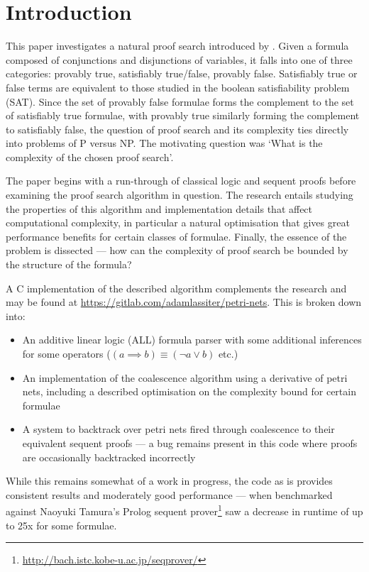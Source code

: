 \chapter{Introduction}
    
    This paper investigates a natural proof search introduced by \citet{petri-nets}.
    Given a formula composed of conjunctions and disjunctions of variables, it falls into one of three categories: provably true, satisfiably true/false, provably false.
    Satisfiably true or false terms are equivalent to those studied in the boolean satisfiability problem (SAT).
    Since the set of provably false formulae forms the complement to the set of satisfiably true formulae, with provably true similarly forming the complement to satisfiably false, the question of proof search and its complexity ties directly into problems of P versus NP\@.
    The motivating question was `What is the complexity of the chosen proof search'.
    
    The paper begins with a run-through of classical logic and sequent proofs before examining the proof search algorithm in question.
    The research entails studying the properties of this algorithm and implementation details that affect computational complexity, in particular a natural optimisation that gives great performance benefits for certain classes of formulae.
    Finally, the essence of the problem is dissected --- how can the complexity of proof search be bounded by the structure of the formula?
    
    A C implementation of the described algorithm complements the research and may be found at \url{https://gitlab.com/adamlassiter/petri-nets}.
    This is broken down into:
    \begin{itemize}
        \item An additive linear logic (ALL) formula parser with some additional inferences for some operators ($(a \implies b) \equiv (\neg a \vee b)$ etc.)
        \item An implementation of the coalescence algorithm using a derivative of petri nets, including a described optimisation on the complexity bound for certain formulae
        \item A system to backtrack over petri nets fired through coalescence to their equivalent sequent proofs --- a bug remains present in this code where proofs are occasionally backtracked incorrectly
    \end{itemize}
    While this remains somewhat of a work in progress, the code as is provides consistent results and moderately good performance --- when benchmarked against Naoyuki Tamura's Prolog sequent prover\footnote{\url{http://bach.istc.kobe-u.ac.jp/seqprover/}} saw a decrease in runtime of up to 25x for some formulae.
